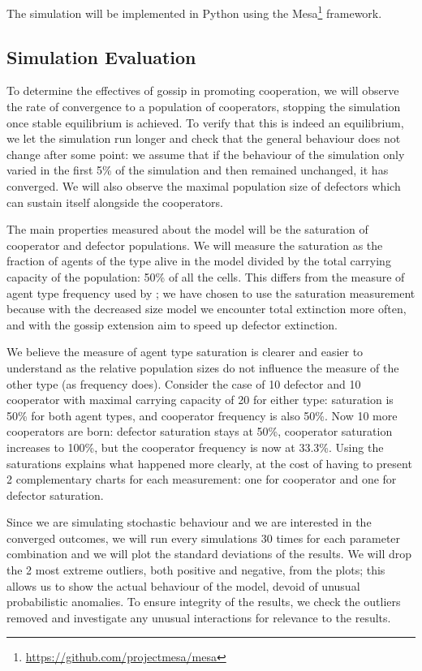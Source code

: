 \documentclass[english]{article}
\begin{document}
The simulation will be implemented in Python using the Mesa\footnote{\url{https://github.com/projectmesa/mesa}} framework.

\subsection{Simulation Evaluation}

To determine the effectives of gossip in promoting cooperation, we will observe the rate of convergence to a population of cooperators, stopping the simulation once stable equilibrium is achieved.
To verify that this is indeed an equilibrium, we let the simulation run longer and check that the general behaviour does not change after some point:
we assume that if the behaviour of the simulation only varied in the first 5\% of the  simulation and then remained unchanged, it has converged.
We will also observe the maximal population size of defectors which can sustain itself alongside the cooperators.

The main properties measured about the model will be the saturation of cooperator and defector populations.
We will measure the saturation as the fraction of agents of the type alive in the model divided by
the total carrying capacity of the population: 50\% of all the cells.
This differs from the measure of agent type frequency used by \citet{smaldino};
we have chosen to use the saturation measurement because with the decreased size model we encounter total extinction more often,
and with the gossip extension aim to speed up defector extinction.

We believe the measure of agent type saturation is clearer and easier to understand
as the relative population sizes do not influence the measure of the other type (as frequency does).
Consider the case of 10 defector and 10 cooperator with maximal carrying capacity of 20 for either type:
saturation is 50\% for both agent types, and cooperator frequency is also 50\%.
Now 10 more cooperators are born:
defector saturation stays at 50\%, cooperator saturation increases to 100\%,
but the cooperator frequency is now at 33.3\%.
Using the saturations explains what happened more clearly, at the cost of having to present 2 complementary charts for each measurement:
one for cooperator and one for defector saturation.

Since we are simulating stochastic behaviour and we are interested in the converged outcomes,
we will run every simulations 30 times for each parameter combination and we will plot the standard deviations of the results.
We will drop the 2 most extreme outliers, both positive and negative, from the plots; this allows us to show the actual behaviour of the model, devoid of unusual probabilistic anomalies.
To ensure integrity of the results, we check the outliers removed and investigate any unusual interactions for relevance to the results.
\end{document}
